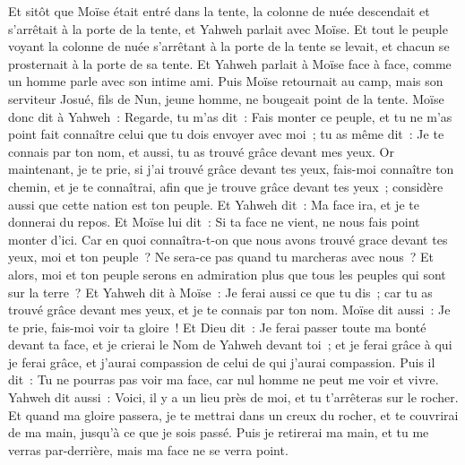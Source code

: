 \begin{multicols}{2}
Et sitôt que Moïse était entré dans la tente, la colonne de nuée descendait et s'arrêtait à la porte de la tente, et Yahweh parlait avec Moïse.
Et tout le peuple voyant la colonne de nuée s'arrêtant à la porte de la tente se levait, et chacun se prosternait à la porte de sa tente.
Et Yahweh parlait à Moïse face à face, comme un homme parle avec son intime ami. Puis Moïse retournait au camp, mais son serviteur Josué, fils de Nun, jeune homme, ne bougeait point de la tente.
Moïse donc dit à Yahweh~: Regarde, tu m'as dit~: Fais monter ce peuple, et tu ne m'as point fait connaître celui que tu dois envoyer avec moi~; tu as même dit~: Je te connais par ton nom, et aussi, tu as trouvé grâce devant mes yeux.
Or maintenant, je te prie, si j'ai trouvé grâce devant tes yeux, fais-moi connaître ton chemin, et je te connaîtrai, afin que je trouve grâce devant tes yeux~; considère aussi que cette nation est ton peuple.
Et Yahweh dit~: Ma face ira, et je te donnerai du repos.
Et Moïse lui dit~: Si ta face ne vient, ne nous fais point monter d'ici.
Car en quoi connaîtra-t-on que nous avons trouvé grace devant tes yeux, moi et ton peuple~? Ne sera-ce pas quand tu marcheras avec nous~? Et alors, moi et ton peuple serons en admiration plus que tous les peuples qui sont sur la terre~?
Et Yahweh dit à Moïse~: Je ferai aussi ce que tu dis~; car tu as trouvé grâce devant mes yeux, et je te connais par ton nom.
Moïse dit aussi~: Je te prie, fais-moi voir ta gloire~!
Et Dieu dit~: Je ferai passer toute ma bonté devant ta face, et je crierai le Nom de Yahweh devant toi~; et je ferai grâce à qui je ferai grâce, et j'aurai compassion de celui de qui j'aurai compassion.
Puis il dit~: Tu ne pourras pas voir ma face, car nul homme ne peut me voir et vivre.
Yahweh dit aussi~: Voici, il y a un lieu près de moi, et tu t'arrêteras sur le rocher.
Et quand ma gloire passera, je te mettrai dans un creux du rocher, et te couvrirai de ma main, jusqu'à ce que je sois passé.
Puis je retirerai ma main, et tu me verras par-derrière, mais ma face ne se verra point.

\end{multicols}
